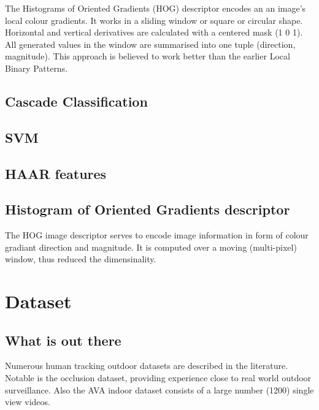 \documentclass{article}
\begin{document}
The Histograms of Oriented Gradients (HOG)\cite{hog} descriptor encodes an an image's local colour gradients.
It works in a sliding window or square or circular shape.
Horizontal and vertical derivatives are calculated with a centered mask (1 0 1).
All generated values in the window are summarised into one tuple (direction, magnitude).
This approach is believed to work better than the earlier Local Binary Patterns.

\subsection{Cascade Classification}

\subsection{SVM}

\subsection{HAAR features}

\subsection{Histogram of Oriented Gradients descriptor}
The HOG image descriptor serves to encode image information in form of colour gradiant direction and magnitude.
It is computed over a moving (multi-pixel) window, thus reduced the dimensinality.

\section{Dataset}
\subsection{What is out there}
Numerous human tracking outdoor datasets are described in the literature\cite{datasets0}\cite{datasets1}.
Notable is the occlusion dataset\cite{datasets2}, providing experience close to real world outdoor surveillance.
Also the AVA indoor dataset\cite{ava} consists of a large number (1200) single view videos.
\end{document}
